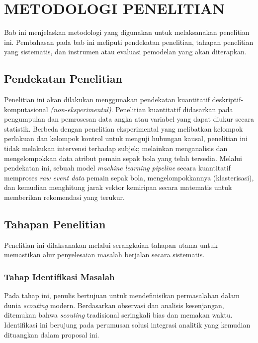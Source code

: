 \chapter{METODOLOGI PENELITIAN}
\label{bab:metodologi}

Bab ini menjelaskan metodologi yang digunakan untuk melaksanakan penelitian ini. Pembahasan pada bab ini meliputi pendekatan penelitian, tahapan penelitian yang sistematis, dan instrumen atau evaluasi pemodelan yang akan diterapkan.

\section{Pendekatan Penelitian}
\label{sec:pendekatan}

Penelitian ini akan dilakukan menggunakan pendekatan kuantitatif deskriptif-komputasional \emph{(non-eksperimental)}. Penelitian kuantitatif didasarkan pada pengumpulan dan pemrosesan data angka atau variabel yang dapat diukur secara statistik. Berbeda dengan penelitian eksperimental yang melibatkan kelompok perlakuan dan kelompok kontrol untuk menguji hubungan kausal, penelitian ini tidak melakukan intervensi terhadap subjek; melainkan menganalisis dan mengelompokkan data atribut pemain sepak bola yang telah tersedia. Melalui pendekatan ini, sebuah model \emph{machine learning pipeline} secara kuantitatif memproses \emph{raw event data} pemain sepak bola, mengelompokkannya (klasterisasi), dan kemudian menghitung jarak vektor kemiripan secara matematis untuk memberikan rekomendasi yang terukur.

\section{Tahapan Penelitian}
\label{sec:tahapan}

Penelitian ini dilaksanakan melalui serangkaian tahapan utama untuk memastikan alur penyelesaian masalah berjalan secara sistematis.

\subsection{Tahap Identifikasi Masalah}
\label{subsec:identifikasi}

Pada tahap ini, penulis bertujuan untuk mendefinisikan permasalahan dalam dunia \emph{scouting} modern. Berdasarkan observasi dan analisis kesenjangan, ditemukan bahwa \emph{scouting} tradisional seringkali bias dan memakan waktu. Identifikasi ini berujung pada perumusan solusi integrasi analitik yang kemudian dituangkan dalam proposal ini.


